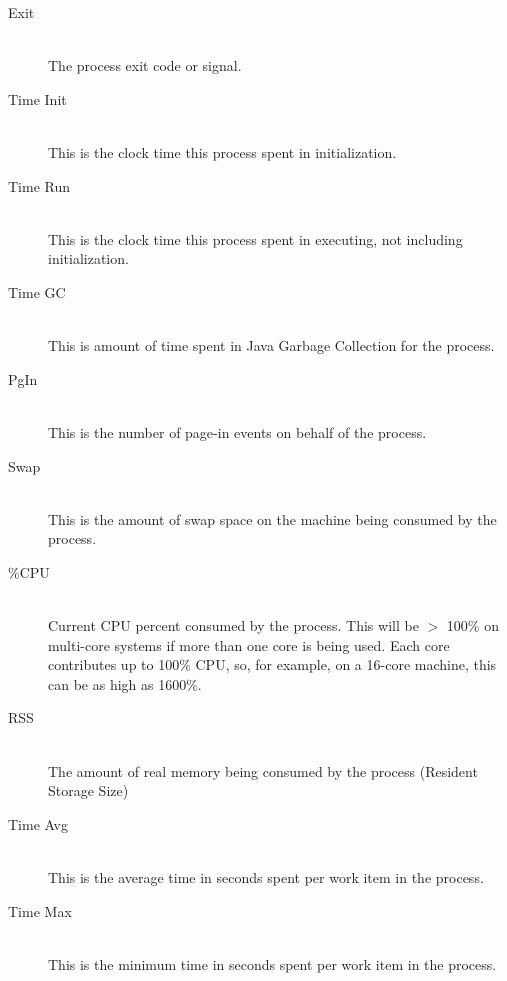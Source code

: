 \begin{description}
          \item[Exit] \hfill \\
            The process exit code or signal.
            
          \item[Time Init] \hfill \\
            This is the clock time this process spent in initialization.
            
          \item[Time Run] \hfill \\
            This is the clock time this process spent in executing, not including
            initialization.
            
          \item[Time GC] \hfill \\
            This is amount of time spent in Java Garbage Collection for the process.
            
          \item[PgIn] \hfill \\
            This is the number of page-in events on behalf of the process.

          \item[Swap] \hfill \\
            This is the amount of swap space on the machine being consumed by the process.

          \item[\%CPU] \hfill \\
            Current CPU percent consumed by the process.  This will be $>$ 100\% on 
            multi-core systems if more than one core is being used.  Each core contributes
            up to 100\% CPU, so, for example, on a 16-core machine, this can be as high
            as 1600\%.
            
          \item[RSS] \hfill \\
            The amount of real memory being consumed by the process (Resident Storage Size)
            
          \item[Time Avg] \hfill \\
            This is the average time in seconds spent per work item in the process.
            
          \item[Time Max] \hfill \\
            This is the minimum time in seconds spent per work item in the process.
            

\end{description}
